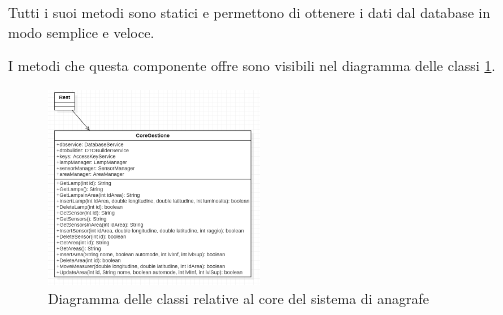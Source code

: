 Tutti i suoi metodi sono statici e permettono di ottenere i dati dal database in modo semplice e veloce.

I metodi che questa componente offre sono visibili nel diagramma delle classi \ref{fig:core_anagrafe}.

\begin{figure}[h]
    \centering
    \includegraphics[width=0.5\textwidth]{img/core_anagrafe.png}
    \caption{Diagramma delle classi relative al core del sistema di anagrafe}
    \label{fig:core_anagrafe}
\end{figure}
